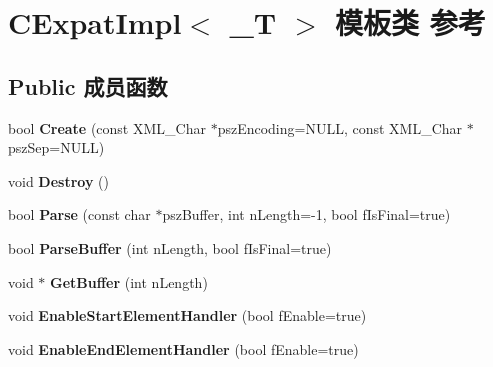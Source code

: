 \hypertarget{class_c_expat_impl}{\section{C\+Expat\+Impl$<$ \+\_\+\+T $>$ 模板类 参考}
\label{class_c_expat_impl}
}
\subsection*{Public 成员函数}
\begin{DoxyCompactItemize}
\item 
\hypertarget{class_c_expat_impl_ada29fce37e448ceb6ea09a98de028149}{bool {\bfseries Create} (const X\+M\+L\+\_\+\+Char $\ast$psz\+Encoding=N\+U\+L\+L, const X\+M\+L\+\_\+\+Char $\ast$psz\+Sep=N\+U\+L\+L)}\label{class_c_expat_impl_ada29fce37e448ceb6ea09a98de028149}

\item 
\hypertarget{class_c_expat_impl_a2e4dcba61823bcc922b1348fcbe787db}{void {\bfseries Destroy} ()}\label{class_c_expat_impl_a2e4dcba61823bcc922b1348fcbe787db}

\item 
\hypertarget{class_c_expat_impl_a76062f116c2a9c99d42631da6e806339}{bool {\bfseries Parse} (const char $\ast$psz\+Buffer, int n\+Length=-\/1, bool f\+Is\+Final=true)}\label{class_c_expat_impl_a76062f116c2a9c99d42631da6e806339}

\item 
\hypertarget{class_c_expat_impl_a35df06396bfa8330598572a3f530a5c1}{bool {\bfseries Parse\+Buffer} (int n\+Length, bool f\+Is\+Final=true)}\label{class_c_expat_impl_a35df06396bfa8330598572a3f530a5c1}

\item 
\hypertarget{class_c_expat_impl_ae9b6bb575b4a81c24384a13433113925}{void $\ast$ {\bfseries Get\+Buffer} (int n\+Length)}\label{class_c_expat_impl_ae9b6bb575b4a81c24384a13433113925}

\item 
\hypertarget{class_c_expat_impl_a17a24b6c1c157f3c843e730f3f796667}{void {\bfseries Enable\+Start\+Element\+Handler} (bool f\+Enable=true)}\label{class_c_expat_impl_a17a24b6c1c157f3c843e730f3f796667}

\item 
\hypertarget{class_c_expat_impl_ac91830d2f654065a22d7331af20a3568}{void {\bfseries Enable\+End\+Element\+Handler} (bool f\+Enable=true)}\label{class_c_expat_impl_ac91830d2f654065a22d7331af20a3568}


\end{DoxyCompactItemize}
